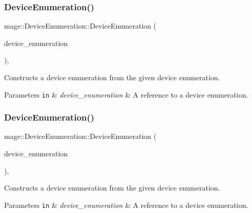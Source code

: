 \subsubsection{\texorpdfstring{Device\+Enumeration()}{DeviceEnumeration()}\hspace{0.1cm}{\footnotesize\ttfamily [2/3]}}
{\footnotesize\ttfamily mage\+::\+Device\+Enumeration\+::\+Device\+Enumeration (\begin{DoxyParamCaption}\item[{const \hyperlink{classmage_1_1_device_enumeration}{Device\+Enumeration} \&}]{device\+\_\+enumeration }\end{DoxyParamCaption})\hspace{0.3cm}{\ttfamily [private]}, {\ttfamily [delete]}}

Constructs a device enumeration from the given device enumeration.


\begin{DoxyParams}[1]{Parameters}
\mbox{\tt in}  & {\em device\+\_\+enumeration} & A reference to a device enumeration. \\
\hline
\end{DoxyParams}
\hypertarget{classmage_1_1_device_enumeration_a2f139e0a31c941d8dd5a0e1ecabe1ab9}{}\label{classmage_1_1_device_enumeration_a2f139e0a31c941d8dd5a0e1ecabe1ab9} 
\subsubsection{\texorpdfstring{Device\+Enumeration()}{DeviceEnumeration()}\hspace{0.1cm}{\footnotesize\ttfamily [3/3]}}
{\footnotesize\ttfamily mage\+::\+Device\+Enumeration\+::\+Device\+Enumeration (\begin{DoxyParamCaption}\item[{\hyperlink{classmage_1_1_device_enumeration}{Device\+Enumeration} \&\&}]{device\+\_\+enumeration }\end{DoxyParamCaption})\hspace{0.3cm}{\ttfamily [private]}, {\ttfamily [delete]}}

Constructs a device enumeration from the given device enumeration.


\begin{DoxyParams}[1]{Parameters}
\mbox{\tt in}  & {\em device\+\_\+enumeration} & A reference to a device enumeration. \\
\hline
\end{DoxyParams}


